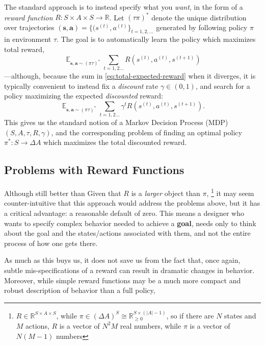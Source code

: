 \documentclass{article}
\DeclareMathOperator*{\Ex}{\mathbb E}
\begin{document}
    The standard approach is to instead specify what you \emph{want}, in the form of a \emph{reward function} $R : S \times A \times S \to \mathbb R$. Let $(\tau\pi)^*$ denote the unique distribution over trajectories $(\mathbf s, \mathbf a) = \{(s^{(t)}, a^{(t)}\}_{t =1,2,\ldots}$ generated by following policy $\pi$ in environment $\tau$. The goal is to automatically learn the policy which maximizes total reward,
    \begin{equation}\label{eq:total-expected-reward}
        \Ex_{\mathbf {s,a} \sim (\pi\tau)^*} \sum_{t=1,2\ldots} R(s^{(t)}, a^{(t)}, s^{(t+1)})
    \end{equation}
    ---although, because the sum in \eqref{eq:total-expected-reward} when it diverges, it is typically convenient to instead fix a \emph{discount} rate $\gamma \in (0,1)$, and search for a policy maximizing the expected \emph{discounted} reward:
    \begin{equation}\label{eq:expected-discounted-reward}
        \Ex_{\mathbf {s,a} \sim (\pi\tau)^*} \sum_{t=1,2\ldots} \gamma^t R(s^{(t)}, a^{(t)}, s^{(t+1)})
        .
    \end{equation}
    This gives us the standard notion of a Markov Decision Process (MDP) $(S, A, \tau, R, \gamma)$, and the corresponding problem of finding an optimal policy $\pi^* : S \to \Delta A$ which maximizes the total discounted reward.


    \subsection{Problems with Reward Functions}
        \label{sec:concern-reward}
    Although still better than
    Given that $R$ is a \emph{larger} object than $\pi$,%
        \footnote{$R \in \mathbb R^{S \times A \times S}$, while $\pi \in (\Delta A)^S \cong \mathbb R_{\ge 0}^{S \times (|A|-1)}$, so if there are $N$ states and $M$ actions, $R$ is a vector of $N^2 M$ real numbers, while $\pi$ is a vector of $N(M-1)$ numbers}
    it may seem counter-intuitive that this approach would address the problems above, but it has a critical advantage: a reasonable default of zero.
    This means a designer who wants to specify complex behavior needed to achieve a \textbf{goal}, needs only to think about the goal and the states/actions associated with them, and not the entire process of how one gets there.

    As much as this buys us, it does not save us from the fact that, once again, subtle mis-specifications of a reward can result in dramatic changes in behavior.
    Moreover, while simple reward functions may be a much more compact and robust description of behavior than a full policy,
\end{document}
